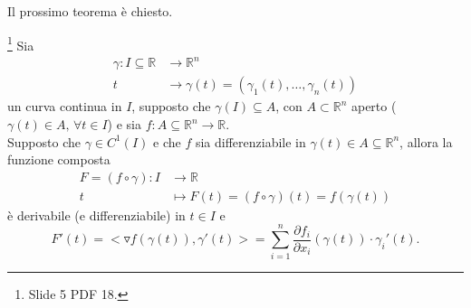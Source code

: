 Il prossimo teorema è chiesto.
\begin{theorem}\footnote{Slide 5 PDF 18.}
	Sia
	\begin{equation*}
		\begin{aligned}
			\gamma:I\subseteq\mathbb{R}&\rightarrow\mathbb{R}^n\\
			t&\rightarrow \gamma(t)=(\gamma_1(t),\hdots,\gamma_n(t))
		\end{aligned}
	\end{equation*}
	un curva continua in $I$, supposto che $\gamma(I)\subseteq A$, con $A\subset\mathbb{R}^n$ aperto ($\gamma(t)\in A,\, \forall t\in I$) e sia $f:A\subseteq\mathbb{R}^n\rightarrow \mathbb{R}$.\\
	Supposto che $\gamma\in C^1(I)$ e che $f$ sia differenziabile in $\gamma(t)\in A\subseteq\mathbb{R}^n$, allora la funzione composta
	\begin{equation*}
		\begin{aligned}
			F=(f\circ \gamma):I &\rightarrow\mathbb{R}\\
			t & \mapsto F(t)= (f\circ \gamma)(t) = f(\gamma(t))
		\end{aligned}
	\end{equation*}
	è derivabile (e differenziabile) in $t\in I$ e
	\begin{equation*}
		F'(t) = <\triangledown f(\gamma(t)),\gamma'(t)> = \sum_{i=1}^{n}\frac{\partial f_i}{\partial x_i}(\gamma(t))\cdot\gamma_i'(t).
	\end{equation*}
\end{theorem}
